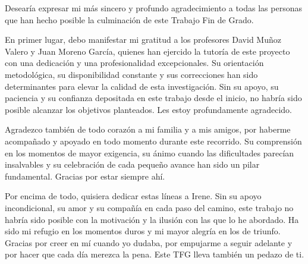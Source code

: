 \begin{agradecimientos}
\noindent
Desearía expresar mi más sincero y profundo agradecimiento a todas las personas que han hecho posible la culminación de este Trabajo Fin de Grado.

En primer lugar, debo manifestar mi gratitud a los profesores David Muñoz Valero y Juan Moreno García, quienes han ejercido la tutoría de este proyecto con una dedicación y una profesionalidad excepcionales. Su orientación metodológica, su disponibilidad constante y sus correcciones han sido determinantes para elevar la calidad de esta investigación. Sin su apoyo, su paciencia y su confianza depositada en este trabajo desde el inicio, no habría sido posible alcanzar los objetivos planteados. Les estoy profundamente agradecido.

Agradezco también de todo corazón a mi familia y a mis amigos, por haberme acompañado y apoyado en todo momento durante este recorrido. Su comprensión en los momentos de mayor exigencia, su ánimo cuando las dificultades parecían insalvables y su celebración de cada pequeño avance han sido un pilar fundamental. Gracias por estar siempre ahí.

Por encima de todo, quisiera dedicar estas líneas a Irene. Sin su apoyo incondicional, su amor y su compañía en cada paso del camino, este trabajo no habría sido posible con la motivación y la ilusión con las que lo he abordado. Ha sido mi refugio en los momentos duros y mi mayor alegría en los de triunfo. Gracias por creer en mí cuando yo dudaba, por empujarme a seguir adelante y por hacer que cada día merezca la pena. Este TFG lleva también un pedazo de ti.
\end{agradecimientos}
